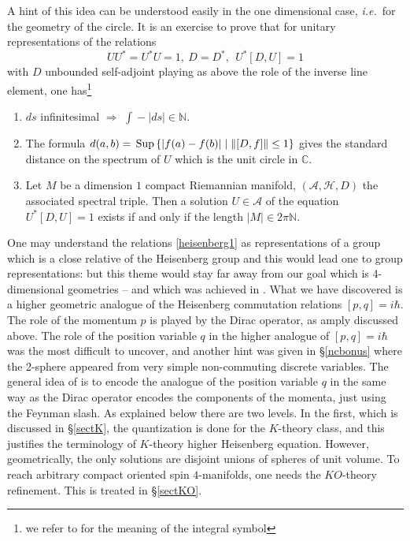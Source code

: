 \documentclass[12pt]{article}
\def\C{{\mathbb C}}
\def\N{{\mathbb N}}
\def\cA{{\mathcal A}}
\def\cH{{\mathcal H}}
\newcommand{\ie}{{\it i.e.\/}\ }
\begin{document}
 A hint of this idea can be understood easily in the one dimensional case, \ie for the geometry of the circle. It is an exercise to prove that for unitary representations of the relations
\begin{equation}\label{heisenberg1}
	UU^*=U^*U=1, \ D=D^*, \ \ U^*[D,U]=1
\end{equation}
with $D$ unbounded self-adjoint playing as above the role of the inverse line element, one has\footnote{we refer to \cite{Co-book} for the meaning of the integral symbol} 
\begin{enumerate}
\item $ds$ infinitesimal $\Rightarrow$ $\displaystyle{\int\!\!\!\!\!\! -}\vert ds\vert\in \N$.
\item The formula $d(a,b)=\,{\rm Sup}\,\{\vert f(a)-f(b)\vert\mid \Vert [D,f]\Vert\leq 1\}$ gives the standard distance on the spectrum of $U$ which is the unit circle in $\C$.
\item Let $M$ be a dimension $1$ compact Riemannian manifold, $(\cA,\cH,D)$ the associated spectral triple. Then a solution $U\in \cA$ of the equation $U^*[D,U]=1$ exists if and only if the length $\vert M\vert \in 2\pi \N$.	
\end{enumerate}
One may understand the relations \eqref{heisenberg1} as representations of a group which is a close relative of the Heisenberg group and this would lead one to group representations: but this theme would stay far away from our goal which is 4-dimensional geometries -- and which was achieved in \cite{acmu1,acmu2}.
What we have discovered is a higher geometric analogue
of the Heisenberg commutation relations $[p,q]=i\hbar$. The role of the momentum $p$ is played by the Dirac operator, as amply discussed above. 
The role of the position variable $q$ in the higher analogue of $[p,q]=i\hbar$ was the most difficult to uncover, and another hint was given in \S \ref{ncbonus} where the 2-sphere appeared from very simple non-commuting  discrete variables. The general idea of \cite{acmu1,acmu2}
  is  to encode the analogue of the  position variable $q$ in the same way as the Dirac operator encodes the components of the momenta, just using the Feynman slash. As explained below there are two levels. In the first, which is discussed in \S \ref{sectK}, the quantization is done  for the $K$-theory class, and this justifies the terminology  of $K$-theory higher Heisenberg equation. However, geometrically, the only solutions are disjoint unions of spheres of unit volume. To reach arbitrary compact oriented spin $4$-manifolds, one needs the $KO$-theory refinement. This is treated in \S \ref{sectKO}. 
\end{document}
